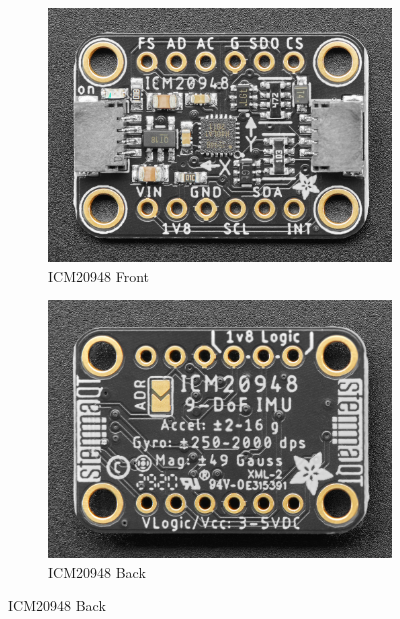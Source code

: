 \documentclass[11pt, oneside]{article}   	%
\begin{document}
\begin{figure}[ht]
\centering
\begin{subfigure}[b]{0.45\textwidth}
\includegraphics[width=\textwidth]{imgs/icm20948-front.png}
\caption{ICM20948 Front}
\end{subfigure}
\begin{subfigure}[b]{0.45\textwidth}
\includegraphics[width=\textwidth]{imgs/icm20948-back.png}
\caption{ICM20948 Back}
\end{subfigure}
\end{figure}
\end{document}
